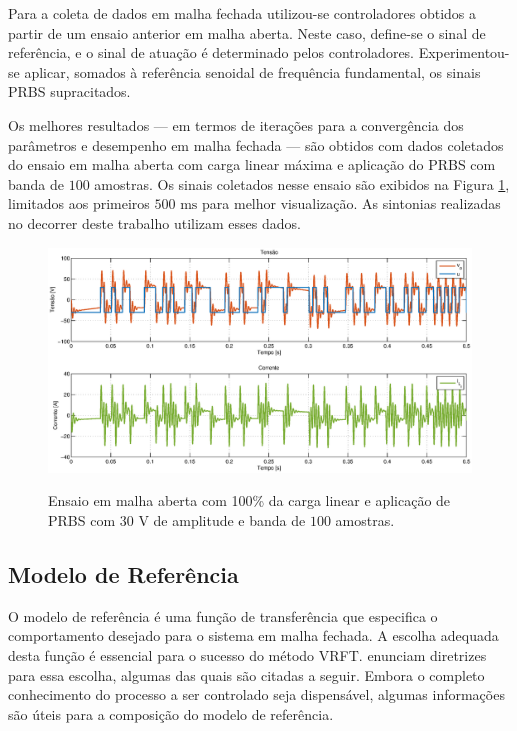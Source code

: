 \documentclass[repeatfields,oneside,overleaf]{tcc}
\begin{document}
Para a coleta de dados em malha fechada utilizou-se controladores obtidos a partir de um ensaio anterior em malha aberta.
Neste caso, define-se o sinal de referência, e o sinal de atuação é determinado pelos controladores.
Experimentou-se aplicar, somados à referência senoidal de frequência fundamental, os sinais PRBS supracitados.

Os melhores resultados --- em termos de iterações para a convergência dos parâmetros e desempenho em malha fechada --- são obtidos com dados coletados do ensaio em malha aberta com carga linear máxima e aplicação do PRBS com banda de $100$ amostras.
Os sinais coletados nesse ensaio são exibidos na Figura \ref{fig:prbs100}, limitados aos primeiros $500 \text{ ms}$ para melhor visualização.
As sintonias realizadas no decorrer deste trabalho utilizam esses dados.


\begin{figure}[h]
    \centering
    \caption{Ensaio em malha aberta com 100\% da carga linear e aplicação de PRBS com $30 \text{ V}$ de amplitude e banda de $100$ amostras.}
    \includegraphics[trim={80 20 80 18}, clip, width=\linewidth]{fig/prbs100.eps}
    \\
    \label{fig:prbs100}
\end{figure}

\subsection{Modelo de Referência}

O modelo de referência é uma função de transferência que especifica o comportamento desejado para o sistema em malha fechada.
A escolha adequada desta função é essencial para o sucesso do método VRFT.
\textcite{Bazanella2011} enunciam diretrizes para essa escolha, algumas das quais são citadas a seguir.
Embora o completo conhecimento do processo a ser controlado seja dispensável, algumas informações são úteis para a composição do modelo de referência.
\end{document}
